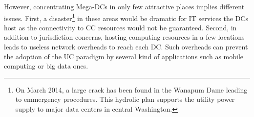 However, concentrating Mega-DCs in only few attractive places implies
different issues. First, a disaster\footnote{On March 2014, a large crack
  has been found in the Wanapum Dame leading to emmergency procedures.
  This hydrolic plan supports the utility power
  supply to major data centers in central
  Washington.}
in these areas would be dramatic for IT services the DCs host as the
connectivity to CC resources would not be guaranteed.
%
Second,  in addition to jurisdiction concerns, hosting
computing resources in a few locations leads to useless network
overheads to reach each DC. Such overheads can prevent the
adoption of the UC paradigm by several kind of applications such as mobile
computing or big data ones.

